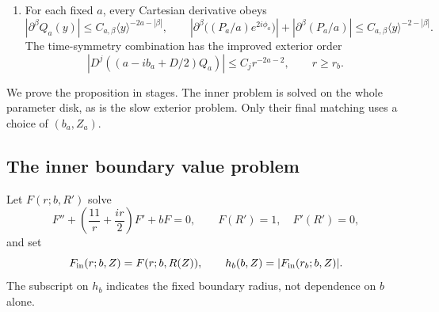 \begin{proposition}
\begin{enumerate}
\begin{equation}
       \le C_{N,J}r^{-2N-2},\qquad 0\le j\le J,\quad r\ge r_b.
\end{equation}
The constants are uniform as $a\downarrow0$.  In particular,
\begin{equation}\label{profile:exterior-pressure}
 |D^j(P_a/a)|\le\eta_j(a)r^{-2},\qquad
 |D^je^{2i\phi_a}|\le C_j,\qquad \eta_j(a)\longrightarrow0
\end{equation}
for each fixed $j$.  On the inner ball,
\begin{equation}\label{profile:pressure-transport}
 W_a(P_a/a)\le Ca(P_a/a),\qquad r\le r_b,
\end{equation}
whereas $|W_a(P_a/a)|\le\eta(a)r^{-2}$ for $r\ge r_b$, with
$\eta(a)\to0$.  Consequently the positive part of $W_a(P_a/a)$ is
bounded uniformly on the whole space.
\item For each fixed $a$, every Cartesian derivative obeys
\begin{equation}\label{profile:fixed-power-symbols}
 |\partial^\beta Q_a(y)|\le C_{a,\beta}\langle y\rangle^{-2a-|\beta|},
 \qquad
 \left|\partial^\beta\big((P_a/a)e^{2i\phi_a}\big)\right|
       +|\partial^\beta(P_a/a)|
       \le C_{a,\beta}\langle y\rangle^{-2-|\beta|}.
\end{equation}
The time-symmetry combination has the improved exterior order
\begin{equation}\label{profile:time-symbol}
 \left|D^j\left((a-ib_a+D/2)Q_a\right)\right|
       \le C_j r^{-2a-2},\qquad r\ge r_b.
\end{equation}
\end{enumerate}
\end{proposition}

We prove the proposition in stages.  The inner problem is solved on the
whole parameter disk, as is the slow exterior problem.  Only their final
matching uses a choice of $(b_a,Z_a)$.

\subsection{The inner boundary value problem}

Let $F(r;b,R')$ solve
\begin{equation}\label{profile:free-initial}
 F''+\left(\frac{11}{r}+\frac{ir}{2}\right)F'+bF=0,
       \qquad F(R')=1,\quad F'(R')=0,
\end{equation}
and set
\[
 F_{\rm in}(r;b,Z)=F(r;b,R(Z)),\qquad
 h_b(b,Z)=|F_{\rm in}(r_b;b,Z)|.
\]
The subscript on $h_b$ indicates the fixed boundary radius, not
dependence on $b$ alone.

